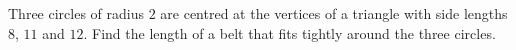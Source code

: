 Three circles of radius $2$ are centred at the vertices of a triangle with side lengths $8$, $11$ and $12$. Find the length of a belt that fits tightly around the three circles.
